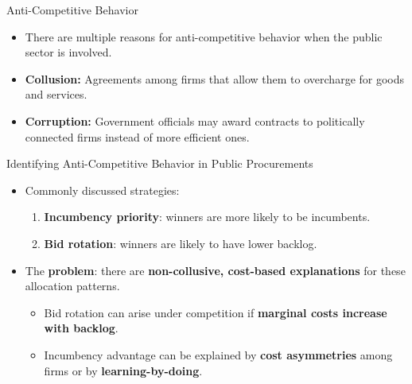 \documentclass[aspectratio=169]{beamer}
\begin{document}
\begin{frame}{Anti-Competitive Behavior}
  \begin{itemize}
    \item There are multiple reasons for anti-competitive behavior when the public sector is involved. \vspace{2mm}
    \item \textbf{Collusion:} Agreements among firms that allow them to overcharge for goods and services. \vspace{2mm}
    \item \textbf{Corruption:} Government officials may award contracts to politically connected firms instead of more efficient ones. \vspace{2mm}
  \end{itemize}
\end{frame}

\begin{frame}{Identifying Anti-Competitive Behavior in Public Procurements}
\begin{itemize}
  \item Commonly discussed strategies: \vspace{1mm}
  \begin{enumerate}
    \item \textbf{Incumbency priority}: winners are more likely to be incumbents.
    \item \textbf{Bid rotation}: winners are likely to have lower backlog.
  \end{enumerate} \pause
  \item The \textbf{problem}: there are \textbf{non-collusive, cost-based explanations} for these allocation patterns. \vspace{1mm}
  \begin{itemize}
    \item Bid rotation can arise under competition if \textbf{marginal costs increase with backlog}.
    \item Incumbency advantage can be explained by \textbf{cost asymmetries} among firms or by \textbf{learning-by-doing}.
  \end{itemize}
\end{itemize}
\end{frame}
\end{document}

